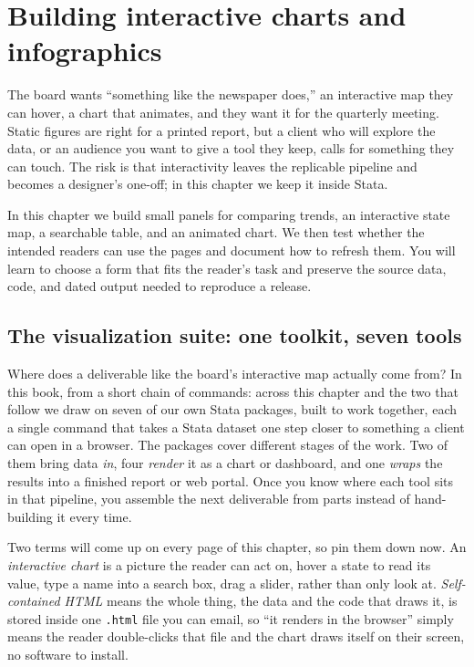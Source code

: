 \documentclass[
    a4paper,
    fontsize=10pt,
    twoside=true,
    numbers=noenddot,
]{kaobook}
\begin{document}
\chapter{Building interactive charts and infographics}\label{ch:interactive}

The board wants \enquote{something like the newspaper does,} an interactive map they can hover, a chart that animates, and they want it for the quarterly meeting. Static figures are right for a printed report, but a client who will explore the data, or an audience you want to give a tool they keep, calls for something they can touch. The risk is that interactivity leaves the replicable pipeline and becomes a designer's one-off; in this chapter we keep it inside Stata.

In this chapter we build small panels for comparing trends, an interactive state map, a searchable table, and an animated chart. We then test whether the intended readers can use the pages and document how to refresh them. You will learn to choose a form that fits the reader's task and preserve the source data, code, and dated output needed to reproduce a release.

\section{The visualization suite: one toolkit, seven tools}\label{sec:suite}
Where does a deliverable like the board's interactive map actually come from? In this book, from a short chain of commands: across this chapter and the two that follow we draw on seven of our own Stata packages, built to work together, each a single command that takes a Stata dataset one step closer to something a client can open in a browser. The packages cover different stages of the work. Two of them bring data \emph{in}, four \emph{render} it as a chart or dashboard, and one \emph{wraps} the results into a finished report or web portal. Once you know where each tool sits in that pipeline, you assemble the next deliverable from parts instead of hand-building it every time.

Two terms will come up on every page of this chapter, so pin them down now. An \emph{interactive chart} is a picture the reader can act on, hover a state to read its value, type a name into a search box, drag a slider, rather than only look at. \emph{Self-contained HTML} means the whole thing, the data and the code that draws it, is stored inside one \texttt{.html} file you can email, so \enquote{it renders in the browser} simply means the reader double-clicks that file and the chart draws itself on their screen, no software to install.
\end{document}

